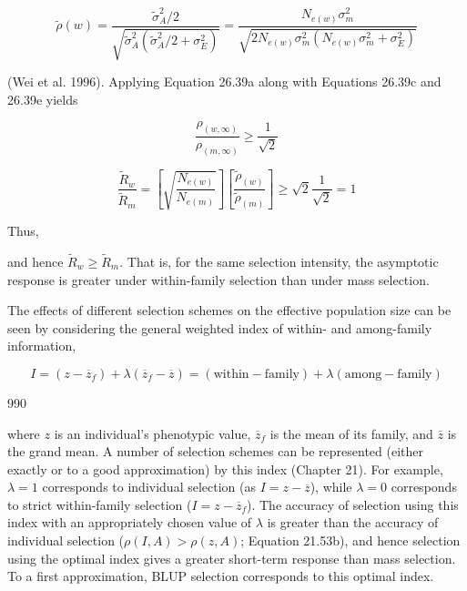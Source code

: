 \documentclass{article}
\begin{document}
{\begin{equation}
\widetilde{\rho}(w)=\frac{\widetilde{\sigma}_{A}^{2}/2}{\sqrt{\widetilde{\sigma}_{A}^{2}(\widetilde{\sigma}_{A}^{2}/2+\sigma_{E}^{2})}}=\frac{N_{e(w)}\sigma_{m}^{2}}{\sqrt{2N_{e(w)}\sigma_{m}^{2}(N_{e(w)}\sigma_{m}^{2}+\sigma_{E}^{2})}}
\tag{29.39e}
\label{eq:29_39e}
\end{equation}

(Wei et al. 1996). Applying Equation 26.39a along with Equations 26.39c and 26.39e yields

\begin{equation}
\frac{\rho_{(w,\infty)}}{\rho_{(m,\infty)}}\geq\frac{1}{\sqrt{2}}
\end{equation}

\begin{equation}
\frac{\widetilde{R}_{w}}{\widetilde{R}_{m}}=\left[\sqrt{\frac{N_{e(w)}}{N_{e(m)}}}\right]\left[\frac{\widetilde{\rho}_{(w)}}{\widetilde{\rho}_{(m)}}\right]\geq\sqrt{2}\frac{1}{\sqrt{2}}=1
\end{equation}

Thus,

and hence  $ \widetilde{R}_{w} \geq \widetilde{R}_{m} $. That is, for the same selection intensity, the asymptotic response is greater under within-family selection than under mass selection.

The effects of different selection schemes on the effective population size can be seen by considering the general weighted index of within- and among-family information,

\begin{equation}
I=(z-\overline{z}_{f})+\lambda(\overline{z}_{f}-\overline{z})=(\mathrm{within-family})+\lambda\left(\mathrm{among-family}\right)
\tag{26.40}
\label{eq:26_40}
\end{equation}

990

where $z$ is an individual's phenotypic value, $\overline{z}_f$ is the mean of its family, and $\overline{z}$ is the grand mean. A number of selection schemes can be represented (either exactly or to a good approximation) by this index (Chapter 21). For example, $\lambda = 1$ corresponds to individual selection (as $I = z - \overline{z}$), while $\lambda = 0$ corresponds to strict within-family selection ($I = z - \overline{z}_f$). The accuracy of selection using this index with an appropriately chosen value of $\lambda$ is greater than the accuracy of individual selection ($\rho(I, A) > \rho(z, A)$; Equation 21.53b), and hence selection using the optimal index gives a greater short-term response than mass selection. To a first approximation, BLUP selection corresponds to this optimal index.

}
\end{document}
